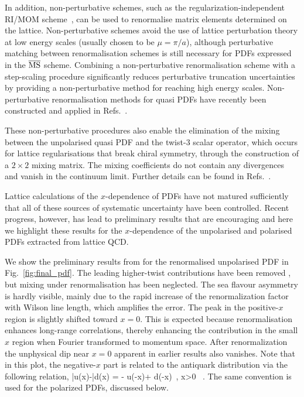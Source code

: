 \begin{itemize}
In addition, non-perturbative schemes, such as the regularization-independent RI/MOM scheme~\cite{Martinelli:1994ty}, can be used to renormalise matrix elements determined on the lattice. Non-perturbative schemes avoid the use of lattice perturbation theory at low energy scales (usually chosen to be $\mu = \pi/a$), although perturbative matching between renormalisation schemes is still necessary for PDFs expressed in the $\overline{\rm MS}$ scheme. Combining a non-perturbative renormalisation scheme with a step-scaling procedure \cite{Luscher:1991wu} significantly reduces perturbative truncation uncertainties by providing a non-perturbative method for reaching high energy scales. 
Non-perturbative renormalisation methods for quasi PDFs have recently been constructed and applied in Refs.~\cite{Alexandrou:2017huk,Chen:2017mzz}.

These non-perturbative procedures also enable the elimination of the mixing between the unpolarised quasi PDF and the 
twist-3 scalar operator, which occurs for lattice regularisations that break chiral symmetry, through the construction of a $2\times2$ mixing matrix. The mixing coefficients 
do not contain any divergences and vanish in the continuum limit. Further details can be found in
Refs.~\cite{Alexandrou:2017huk,Chen:2017mzz}. 
\end{itemize}

Lattice calculations of the $x$-dependence of PDFs have not matured sufficiently that all of these sources of systematic uncertainty have been controlled. Recent progress, however, has lead to preliminary results that are encouraging and here we highlight these results for the $x$-dependence
of the unpolarised and polarised PDFs extracted from lattice QCD. 

We show the preliminary results from \cite{Chen:2017mzz} for the renormalised unpolarised PDF in Fig.~\ref{fig:final_pdf}. The leading higher-twist contributions have been removed \cite{Chen:2016utp}, but mixing under renormalisation has been neglected. The sea flavour asymmetry is hardly visible, mainly due to the rapid increase 
of the renormalization factor with Wilson line length, which amplifies the error.
%
The peak in the positive-$x$ 
region is slightly shifted toward $x{=}0$. This is expected because renormalisation enhances long-range correlations, thereby enhancing the contribution in the small $x$ region when Fourier transformed to momentum space. After renormalization the unphysical dip near $x=0$ apparent in earlier 
results also vanishes.
%
Note that in this plot, the negative-$x$ part is related to the antiquark distribution via
the following relation,
\be
\bar{u}(x)-\bar{d}(x) = - u(-x)+ d(-x)\, , \quad x>0 \, .
\ee
The same convention is used for the polarized PDFs, discussed below.

